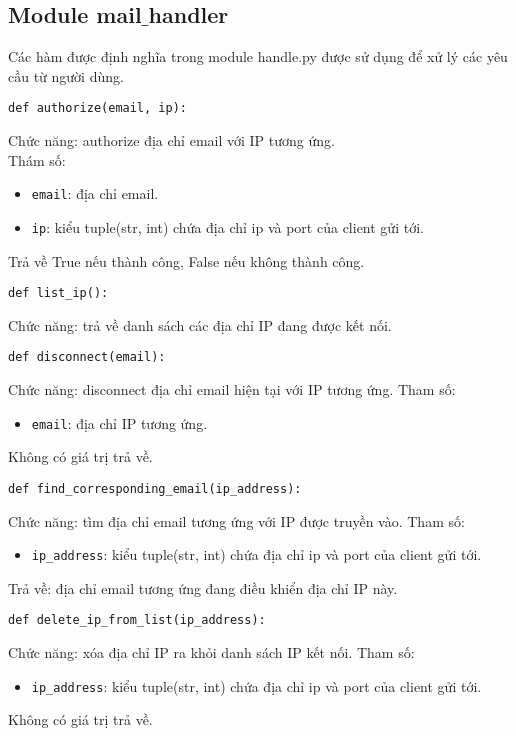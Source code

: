 \subsection{Module mail$\_$handler}
Các hàm được định nghĩa trong module handle.py được sử dụng để xử lý các yêu cầu từ người dùng.
\begin{lstlisting}
def authorize(email, ip):
\end{lstlisting}
Chức năng: authorize địa chỉ email với IP tương ứng.\\
Thám số: 
\begin{itemize}
\item \lstinline{email}: địa chỉ email.
\item \lstinline{ip}: kiểu tuple(str, int) chứa địa chỉ ip và port của client gửi tới.
\end{itemize}
Trả về True nếu thành công, False nếu không thành công.

\begin{lstlisting}
def list_ip():
\end{lstlisting}
Chức năng: trả về danh sách các địa chỉ IP đang được kết nối.

\begin{lstlisting}
def disconnect(email):
\end{lstlisting}
Chức năng: disconnect địa chỉ email hiện tại với IP tương ứng.
Tham số:
\begin{itemize}
\item \lstinline{email}: địa chỉ IP tương ứng.
\end{itemize}
Không có giá trị trả về.

\begin{lstlisting}
def find_corresponding_email(ip_address):
\end{lstlisting}
Chức năng: tìm địa chỉ email tương ứng với IP được truyền vào.
Tham số:
\begin{itemize}
\item \lstinline{ip_address}: kiểu tuple(str, int) chứa địa chỉ ip và port của client gửi tới.
\end{itemize}
Trả về: địa chỉ email tương ứng đang điều khiển địa chỉ IP này.

\begin{lstlisting}
def delete_ip_from_list(ip_address):
\end{lstlisting}
Chức năng: xóa địa chỉ IP ra khỏi danh sách IP kết nối.
Tham số: 
\begin{itemize}
\item \lstinline{ip_address}: kiểu tuple(str, int) chứa địa chỉ ip và port của client gửi tới.
\end{itemize}
Không có giá trị trả về.

